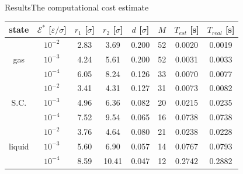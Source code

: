 \documentclass{beamer}
\begin{document}
\begin{frame}{Results}{The computational cost estimate}
  \begin{table}[t]
  \centering
  \begin{tabular*}{0.99\textwidth}{@{\extracolsep{\fill}}cc|cccccc}
    state &
    $\mathcal E^\ast$ [$\varepsilon/\sigma$]&
    $r_1$ [$\sigma$]&
    $r_2$ [$\sigma$]&
    $d$  [$\sigma$]&
    $M$ &    
    $T_{est}$ [\textsf s]&
    $T_{real}$ [\textsf s] \\\hline
         &$10^{-2}$ & 2.83 & 3.69 & 0.200 & 52 & 0.0020  &  0.0019  \\
    gas  &$10^{-3}$ & 4.24 & 5.61 & 0.200 & 52 & 0.0031  &  0.0033  \\
         &$10^{-4}$ & 6.05 & 8.24 & 0.126 & 33 & 0.0070  &  0.0077  \\
    \hline
         &$10^{-2}$ & 3.41 & 4.31 & 0.127 & 31 & 0.0073  & 0.0082   \\
    S.C. &$10^{-3}$ & 4.96 & 6.36 & 0.082 & 20 & 0.0215   & 0.0235    \\
         &$10^{-4}$ & 7.52 & 9.54 & 0.065 & 16 & 0.0738   & 0.0738    \\
    \hline
           &$10^{-2}$ & 3.76 & 4.64 & 0.080 & 21 & 0.0238   & 0.0228    \\
    liquid &$10^{-3}$ & 5.60 & 6.90 & 0.057 & 14 & 0.0767   & 0.0793    \\
           &$10^{-4}$ & 8.59 &10.41 & 0.047 & 12 & 0.2742   & 0.2882   \\
  \end{tabular*}
\end{table}
\end{frame}
\end{document}
